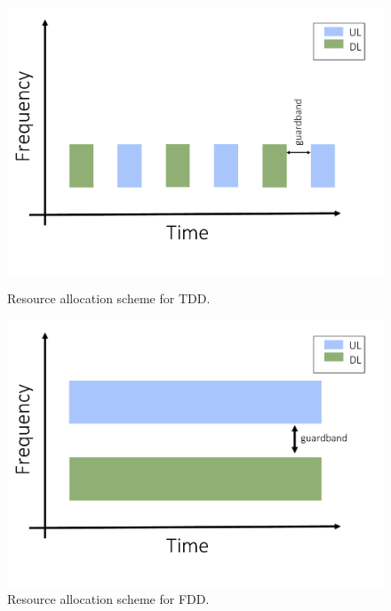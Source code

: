 \begin{figure}[!h]
  \centering
  \begin{minipage}[b]{0.45\textwidth}
    \includegraphics[width=\textwidth]{../images/TDDResourceAllocation.pdf}
    \caption{Resource allocation scheme for \gls{TDD}.}
    \label{fig:TDD}
  \end{minipage}
\hspace*{\fill}
  \begin{minipage}[b]{0.45\textwidth}
    \includegraphics[width=\textwidth]{../images/FDDResourceAllocation.pdf}
    \caption{Resource allocation scheme for \gls{FDD}.}
    \label{fig:FDD}
  \end{minipage}
\end{figure}



